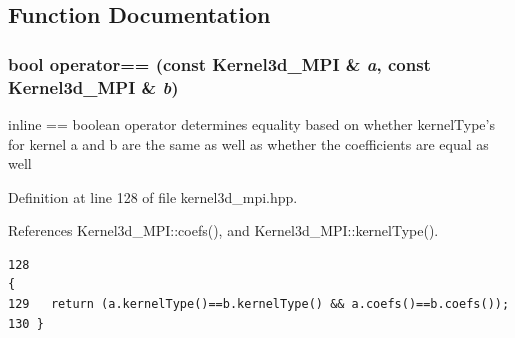\subsection{Function Documentation}
\subsubsection{\setlength{\rightskip}{0pt plus 5cm}bool operator== (const {\bf Kernel3d\_\-MPI} \& {\em a}, const {\bf Kernel3d\_\-MPI} \& {\em b})\hspace{0.3cm}{\tt  [inline]}}\label{kernel3d__mpi_8hpp_ca32ba56e6a871c420ca0123b8f89ea2_ca32ba56e6a871c420ca0123b8f89ea2}


inline == boolean operator determines equality based on whether kernel\-Type's for kernel a and b are the same as well as whether the coefficients are equal as well 

Definition at line 128 of file kernel3d\_\-mpi.hpp.

References Kernel3d\_\-MPI::coefs(), and Kernel3d\_\-MPI::kernel\-Type().

\footnotesize\begin{verbatim}128                                                                      {
129   return (a.kernelType()==b.kernelType() && a.coefs()==b.coefs());
130 }
\end{verbatim}\normalsize 


